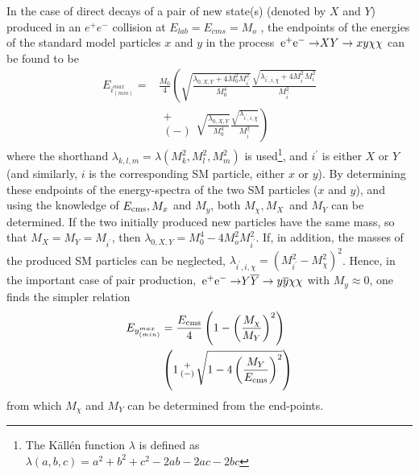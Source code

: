 In the case of direct decays of a pair of new state(s) (denoted by
$X$ and $Y$) produced
in an $e^+e^-$ collision at $E_{lab} = E_{cms} = M_o$ , 
the endpoints
of the energies of the standard model particles $x$ and $y$ 
in the process
$\mbox{$ {\, \mathrm e}^+ {\mathrm e}^- \to $} X Y \rightarrow x y  \chi \chi$
can be found to be
\begin{align}
E_{i^{max}_{(min)}}=&
 \frac{M_0} { 4 } 
\left (  
\sqrt {  \frac{ \lambda_{0,X,Y} + 4  M^2_0 M^2_{i^\prime} } { M^4_0 }}
\frac{ \sqrt {   \lambda_{i^\prime,i,\chi} + 4  M^2_{i^\prime} M^2_{i} }}
 {M^2_{i^\prime} } \right . \nonumber \\ 
  & \left . \begin{smallmatrix}+ \\ (-)\end{smallmatrix} 
\sqrt {  \frac{ \lambda_{0,X,Y} } { M^4_0 }}
\frac{\sqrt { \lambda_{i^\prime,i,\chi} }  } {M^2_{i^\prime} } 
\right )  
\label{eq:searches_genspartendp} 
 \end{align}
where
the shorthand  $\lambda_{k,l,m} = \lambda(M^2_k,M^2_l,M^2_m)$ is used\footnote{
The K\"all\'en function $\lambda$ is defined as $\lambda(a,b,c) = a^2 + b^2 +c^2 -2ab - 2ac - 2bc$}, and 
$i^\prime$ is either $X$ or $Y$ (and similarly, $i$ is the corresponding
SM particle, either $x$ or $y$)\cite{Berggren:2015qua}.
By determining these endpoints of the energy-spectra of the two SM particles ($x$ and $y$),
and using the knowledge of $\mbox{$ E_{\mathrm{\small cms}} $}, M_x$ and $M_y$, both $M_\chi, M_X$\ and $M_Y$ can 
be determined.
If  the two initially produced new particles have the same mass, 
so that $ M_{X} = M_{Y} = M_{i^\prime}$, 
then  $\lambda_{0,X,Y} = M^4_0 - 4 M^2_o M^2_{i^\prime}$.
If, in addition, the masses of the produced SM particles can be neglected,
$\lambda_{i^\prime,i,\chi} = (M^2_{i^\prime}-M^2_\chi)^2$.
Hence, in the important case of pair production,   
$\eeto Y \bar{Y} \rightarrow y \bar{y} \chi \chi$ with $M_y \approx 0$, one finds the
simpler relation
\begin{align}
E_{y^{max}_{(min)}} &=  
   { \mbox{$ E_{\mathrm{\small cms}} $} \over 4}  \left ( 1 - \left( { M_\chi \over M_{Y} } \right )^2 \right ) \nonumber \\
   &\left ( 1  \begin{smallmatrix}+ \\ (-)\end{smallmatrix}  \sqrt{1 -  4 \left ( {  M_{Y} \over \mbox{$ E_{\mathrm{\small cms}} $}   } \right )^2} \right )
\label{eq:searches_sleptpairendp}
\end{align}
from which $M_\chi$ and $M_Y$ can be determined from the end-points.

